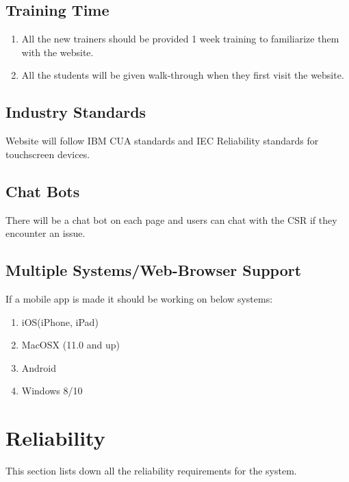 \documentclass{article}
\begin{document}
\subsection{Training Time}
\begin{enumerate}
    \item All the new trainers should be provided 1 week training to familiarize them with the website.
    \item All the students will be given walk-through when they first visit the website.
\end{enumerate}

\subsection{Industry Standards}
Website will follow IBM CUA standards and IEC Reliability standards for touchscreen devices.

\subsection{Chat Bots}
There will be a chat bot on each page and users can chat with the CSR if they encounter an issue. 

\subsection{Multiple Systems/Web-Browser Support}
If a mobile app is made it should be working on below systems:
\begin{enumerate}
    \item iOS(iPhone, iPad)
    \item MacOSX (11.0 and up)
    \item Android
    \item Windows 8/10
\end{enumerate}

\section{ Reliability}
This section lists down all the reliability requirements for the system.
\end{document}
